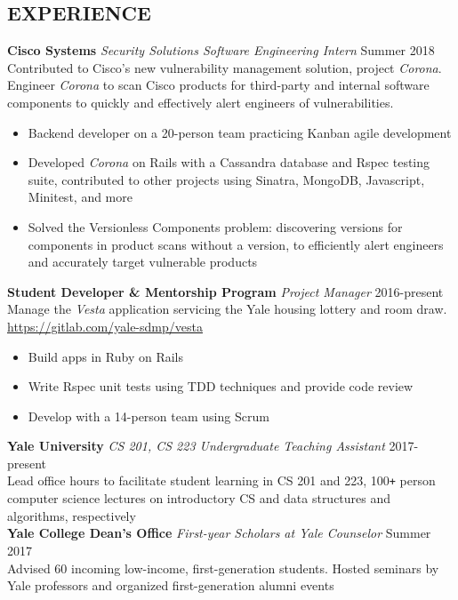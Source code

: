 \documentclass[margin, centered]{res}
\def\Plus{\texttt{+}}
\begin{document}
\begin{resume}
  \section{EXPERIENCE}
  \textbf{Cisco Systems} \textit{Security Solutions Software Engineering Intern} \hfill Summer 2018 \newline
  Contributed to Cisco's new vulnerability management solution, project \textit{Corona}. 
  Engineer \textit{Corona} to scan Cisco products for third-party and internal software components to quickly and effectively alert engineers of vulnerabilities.\smallskip{}
  \begin{itemize}
      \item Backend developer on a 20-person team practicing Kanban agile development
      \item Developed \textit{Corona} on Rails with a Cassandra database and Rspec testing suite, contributed to other projects using Sinatra, MongoDB, Javascript, Minitest, and more
      \item Solved the Versionless Components problem: discovering versions for components in product scans without a version, to efficiently alert engineers and accurately target vulnerable products
  \end{itemize}
  \textbf{Student Developer \&  Mentorship Program} \textit{Project Manager} \hfill 2016-present \\
  Manage the \textit{Vesta} application servicing the Yale housing lottery and room draw. \\ 
  \href{https://gitlab.com/yale-sdmp/vesta}{https://gitlab.com/yale-sdmp/vesta}\smallskip{}
  \begin{itemize}
    \item Build apps in Ruby on Rails
    \item Write Rspec unit tests using TDD techniques and provide code review
    \item Develop with a 14-person team using Scrum
  \end{itemize}
  \textbf{Yale University} \textit{CS 201, CS 223 Undergraduate Teaching Assistant} \hfill 2017-present \\
  Lead office hours to facilitate student learning in CS 201 and 223, 100\Plus{} person computer science lectures on introductory CS and data structures and algorithms, respectively \\ 
  \textbf{Yale College Dean's Office} \textit{First-year Scholars at Yale Counselor} \hfill Summer 2017 \\
  Advised 60 incoming low-income, first-generation students. Hosted seminars by Yale professors and organized first-generation alumni events


\end{resume}
\end{document}

